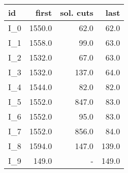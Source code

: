 \begin{tabular}{lrrr}
\toprule
   id &  first &  sol. cuts &  last \\
\midrule
 I\_0 & 1550.0 &       62.0 &  62.0 \\
 I\_1 & 1558.0 &       99.0 &  63.0 \\
 I\_2 & 1532.0 &       67.0 &  63.0 \\
 I\_3 & 1532.0 &      137.0 &  64.0 \\
 I\_4 & 1544.0 &       82.0 &  82.0 \\
 I\_5 & 1552.0 &      847.0 &  83.0 \\
 I\_6 & 1552.0 &       95.0 &  83.0 \\
 I\_7 & 1552.0 &      856.0 &  84.0 \\
 I\_8 & 1594.0 &      147.0 & 139.0 \\
 I\_9 &  149.0 &        - & 149.0 \\
\bottomrule
\end{tabular}
